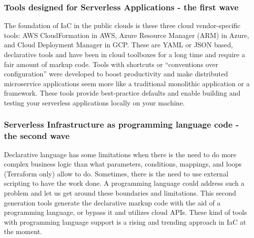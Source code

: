 \subsubsection{Tools designed for Serverless Applications - the first wave}
The foundation of IaC in the public clouds is these three cloud vendor-specific tools: AWS CloudFormation in AWS, Azure Resource Manager (ARM) in Azure, and Cloud Deployment Manager in GCP.
These are YAML or JSON based, declarative tools and have been in cloud toolboxes for a long time and require a fair amount of markup code.
Tools with shortcuts or “conventions over configuration” were developed to boost productivity and make distributed microservice applications seem more like a traditional monolithic application or a framework.
These tools provide best-practice defaults and enable building and testing your serverless applications locally on your machine.
\subsubsection{Serverless Infrastructure as programming language code - the second wave}
\label{sssec:second-wave}
Declarative language has some limitations when there is the need to do more complex business logic than what parameters, conditions, mappings, and loops (Terraform only) allow to do.
Sometimes, there is the need to use external scripting to have the work done.
A programming language could address such a problem and let us get around these boundaries and limitations.
This second generation tools generate the declarative markup code with the aid of a programming language, or bypass it and utilizes cloud APIs.
These kind of tools with programming language support is a rising and trending approach in IaC at the moment.